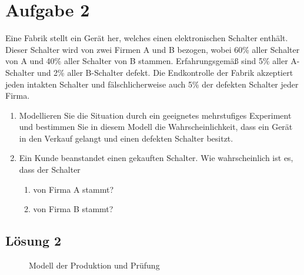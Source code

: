 \documentclass[main.tex]{subfiles}
\begin{document}
\section{Aufgabe 2}

Eine Fabrik stellt ein Gerät her, welches einen elektronischen Schalter enthält. Dieser Schalter wird von zwei Firmen A und B bezogen, wobei 60\% aller Schalter von A und 40\% aller Schalter von B stammen. Erfahrungsgemäß sind 5\% aller A-Schalter und 2\% aller B-Schalter defekt. Die Endkontrolle der Fabrik akzeptiert jeden intakten Schalter
und fälschlicherweise auch 5\% der defekten Schalter jeder Firma.
\begin{enumerate}
    \item Modellieren Sie die Situation durch ein geeignetes mehrstufiges Experiment und bestimmen Sie in diesem Modell die Wahrscheinlichkeit, dass ein Gerät in den Verkauf gelangt und einen defekten Schalter besitzt.
    \item Ein Kunde beanstandet einen gekauften Schalter. Wie wahrscheinlich ist es, dass der Schalter
    \begin{enumerate}
        \item von Firma A stammt?
        \item von Firma B stammt?
    \end{enumerate}
\end{enumerate}

\subsection{Lösung 2}
\begin{figure}[h]
    \caption{Modell der Produktion und Prüfung}
    \label{fig:lgs2}
\end{figure}
\end{document}
